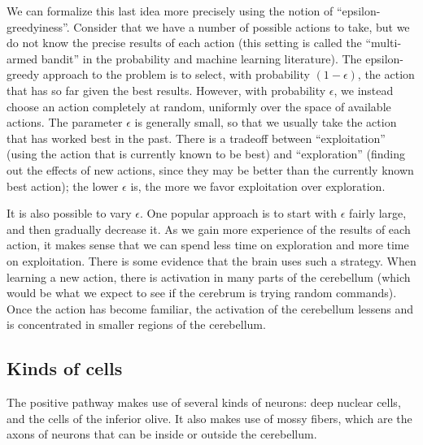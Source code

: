 \documentclass{article}
\theoremstyle{definition}
\begin{document}
We can formalize this last idea more precisely using the notion of
``epsilon-greedyiness''. Consider that we have a number of possible
actions to take, but we do not know the precise results of each action
(this setting is called the ``multi-armed bandit'' in the probability
and machine learning literature). The epsilon-greedy approach to the
problem is to select, with probability $(1-\epsilon)$, the action that
has so far given the best results. However, with probability
$\epsilon$, we instead choose an action completely at random,
uniformly over the space of available actions. The parameter
$\epsilon$ is generally small, so that we usually take the action that
has worked best in the past. There is a tradeoff between
``exploitation'' (using the action that is currently known to be best)
and ``exploration'' (finding out the effects of new actions, since
they may be better than the currently known best action); the lower
$\epsilon$ is, the more we favor exploitation over exploration.

It is also possible to vary $\epsilon$. One popular approach is to
start with $\epsilon$ fairly large, and then gradually decrease it. As
we gain more experience of the results of each action, it makes sense
that we can spend less time on exploration and more time on
exploitation. There is some evidence that the brain uses such a
strategy. When learning a new action, there is activation in many
parts of the cerebellum (which would be what we expect to see if the
cerebrum is trying random commands). Once the action has become
familiar, the activation of the cerebellum lessens and is concentrated
in smaller regions of the cerebellum.

\subsection{Kinds of cells}

The positive pathway makes use of several kinds of neurons: deep
nuclear cells, and the cells of the inferior olive. It also makes use
of mossy fibers, which are the axons of neurons that can be inside or
outside the cerebellum.
\end{document}
